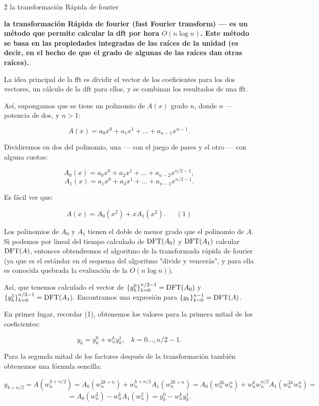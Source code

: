 \h2{ la transformación Rápida de fourier }

\bf{la transformación Rápida de fourier} (fast Fourier transform) --- es un método que permite calcular la dft por hora $O(n \log n)$. Este método se basa en las propiedades integradas de las raíces de la unidad (es decir, en el hecho de que el grado de algunas de las raíces dan otras raíces).

La idea principal de la fft es dividir el vector de los coeficientes para los dos vectores, un cálculo de la dft para ellos, y se combinan los resultados de una fft.

Así, supongamos que se tiene un polinomio de $A(x)$ grado $n$, donde $n$ --- potencia de dos, y $n>1$:

$$ A(x) = a_0 x^0 + a_1 x^1 + \ldots + a_{n-1} x^{n-1}. $$

Dividiremos en dos del polinomio, una --- con el juego de pares y el otro --- con alguna cuotas:

$$ A_0(x) = a_0 x^0 + a_2 x^1 + \ldots + a_{n-2} x^{n/2-1}, $$
$$ A_1(x) = a_1 x^0 + a_3 x^1 + \ldots + a_{n-1} x^{n/2-1}. $$

Es fácil ver que:

$$ A(x) = A_0(x^2) + x A_1(x^2). ~~~~~~~(1) $$

Los polinomios de $A_0$ y $A_1$ tienen el doble de menor grado que el polinomio de $A$. Si podemos por lineal del tiempo calculado de ${\rm DFT}(A_0)$ y ${\rm DFT}(A_1)$ calcular ${\rm DFT}(A)$, entonces obtendremos el algoritmo de la transformada rápida de fourier (ya que es el estándar en el esquema del algoritmo "divide y vencerás", y para ella es conocida quebrada la evaluación de la $O(n \log n)$).

Así, que tenemos calculado el vector de $\{ y_k^0 \}_{k=0}^{n/2-1} = {\rm DFT}(A_0)$ y $\{ y_k^1 \}_{k=0}^{n/2-1} = {\rm DFT}(A_1)$. Encontramos una expresión para $\{ y_k \}_{k=0}^{n-1} = {\rm DFT}(A)$.

En primer lugar, recordar (1), obtenemos los valores para la primera mitad de los coeficientes:

$$ y_k = y_k^0 + w_n^k y_k^1, ~~~~ k = 0 \ldots, n/2-1. $$

Para la segunda mitad de los factores después de la transformación también obtenemos una fórmula sencilla:

$$ y_{k+n/2} = A(w_n^{k+n/2}) = A_0(w_n^{2k+n}) + w_n^{k+n/2} A_1(w_n^{2k+n}) = A_0(w_n^{2k} w_n^n) + w_n^k w_n^{n/2} A_1(w_n^{2k} w_n^n) = $$
$$ = A_0(w_n^{2}) - w_n^k A_1(w_n^{2}) = y_k^0 - w_n^k y_k^1. $$

